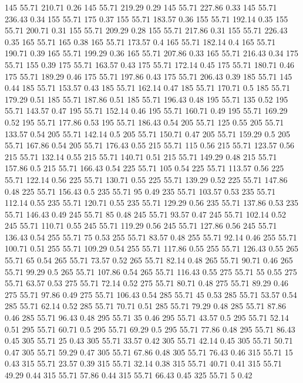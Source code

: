 145	55.71	210.71	0.26
145	55.71	219.29	0.29
145	55.71	227.86	0.33
145	55.71	236.43	0.34
155	55.71	175	0.37
155	55.71	183.57	0.36
155	55.71	192.14	0.35
155	55.71	200.71	0.31
155	55.71	209.29	0.28
155	55.71	217.86	0.31
155	55.71	226.43	0.35
165	55.71	165	0.38
165	55.71	173.57	0.4
165	55.71	182.14	0.4
165	55.71	190.71	0.39
165	55.71	199.29	0.36
165	55.71	207.86	0.33
165	55.71	216.43	0.34
175	55.71	155	0.39
175	55.71	163.57	0.43
175	55.71	172.14	0.45
175	55.71	180.71	0.46
175	55.71	189.29	0.46
175	55.71	197.86	0.43
175	55.71	206.43	0.39
185	55.71	145	0.44
185	55.71	153.57	0.43
185	55.71	162.14	0.47
185	55.71	170.71	0.5
185	55.71	179.29	0.51
185	55.71	187.86	0.51
185	55.71	196.43	0.48
195	55.71	135	0.52
195	55.71	143.57	0.47
195	55.71	152.14	0.46
195	55.71	160.71	0.49
195	55.71	169.29	0.52
195	55.71	177.86	0.53
195	55.71	186.43	0.54
205	55.71	125	0.55
205	55.71	133.57	0.54
205	55.71	142.14	0.5
205	55.71	150.71	0.47
205	55.71	159.29	0.5
205	55.71	167.86	0.54
205	55.71	176.43	0.55
215	55.71	115	0.56
215	55.71	123.57	0.56
215	55.71	132.14	0.55
215	55.71	140.71	0.51
215	55.71	149.29	0.48
215	55.71	157.86	0.5
215	55.71	166.43	0.54
225	55.71	105	0.54
225	55.71	113.57	0.56
225	55.71	122.14	0.56
225	55.71	130.71	0.55
225	55.71	139.29	0.52
225	55.71	147.86	0.48
225	55.71	156.43	0.5
235	55.71	95	0.49
235	55.71	103.57	0.53
235	55.71	112.14	0.55
235	55.71	120.71	0.55
235	55.71	129.29	0.56
235	55.71	137.86	0.53
235	55.71	146.43	0.49
245	55.71	85	0.48
245	55.71	93.57	0.47
245	55.71	102.14	0.52
245	55.71	110.71	0.55
245	55.71	119.29	0.56
245	55.71	127.86	0.56
245	55.71	136.43	0.54
255	55.71	75	0.53
255	55.71	83.57	0.48
255	55.71	92.14	0.46
255	55.71	100.71	0.51
255	55.71	109.29	0.54
255	55.71	117.86	0.55
255	55.71	126.43	0.55
265	55.71	65	0.54
265	55.71	73.57	0.52
265	55.71	82.14	0.48
265	55.71	90.71	0.46
265	55.71	99.29	0.5
265	55.71	107.86	0.54
265	55.71	116.43	0.55
275	55.71	55	0.55
275	55.71	63.57	0.53
275	55.71	72.14	0.52
275	55.71	80.71	0.48
275	55.71	89.29	0.46
275	55.71	97.86	0.49
275	55.71	106.43	0.54
285	55.71	45	0.53
285	55.71	53.57	0.54
285	55.71	62.14	0.52
285	55.71	70.71	0.51
285	55.71	79.29	0.48
285	55.71	87.86	0.46
285	55.71	96.43	0.48
295	55.71	35	0.46
295	55.71	43.57	0.5
295	55.71	52.14	0.51
295	55.71	60.71	0.5
295	55.71	69.29	0.5
295	55.71	77.86	0.48
295	55.71	86.43	0.45
305	55.71	25	0.43
305	55.71	33.57	0.42
305	55.71	42.14	0.45
305	55.71	50.71	0.47
305	55.71	59.29	0.47
305	55.71	67.86	0.48
305	55.71	76.43	0.46
315	55.71	15	0.43
315	55.71	23.57	0.39
315	55.71	32.14	0.38
315	55.71	40.71	0.41
315	55.71	49.29	0.44
315	55.71	57.86	0.44
315	55.71	66.43	0.45
325	55.71	5	0.42
